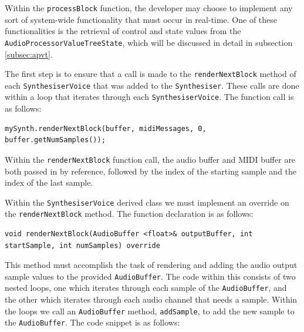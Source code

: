 \documentclass[a4paper,12pt]{report}
\begin{document}
Within the \texttt{process\-Block} function, the developer may choose to implement any sort of system-wide functionality that must occur in real-time. One of these functionalities is the retrieval of control and state values from the \texttt{Audio\-Processor\-Value\-Tree\-State}, which will be discussed in detail in subsection \ref{subsec:apvt}.

The first step is to ensure that a call is made to the \texttt{render\-Next\-Block} method of each \texttt{Synthesiser\-Voice} that was added to the \texttt{Synthesiser}. These calls are done within a loop that iterates through each \texttt{Synthesiser\-Voice}. The function call is as follows: 

 \noindent\begin{minipage}{\linewidth} \begin{lstlisting}[caption={\texttt{renderNextBlock} function call},label={code:rendernextblockfunccall},captionpos=b]
mySynth.renderNextBlock(buffer, midiMessages, 0, buffer.getNumSamples());
\end{lstlisting} \end{minipage}

Within the \texttt{renderNextBlock} function call, the audio buffer and MIDI buffer are both passed in by reference, followed by the index of the starting sample and the index of the last sample.

Within the \texttt{Synthesiser\-Voice} derived class we must implement an override on the \texttt{render\-Next\-Block} method. The function declaration is as follows:

 \noindent\begin{minipage}{\linewidth} \begin{lstlisting}[caption={\texttt{renderNextBlock()} override},label={code:rendernextblockoverride},captionpos=b]
void renderNextBlock(AudioBuffer <float>& outputBuffer, int startSample, int numSamples) override
\end{lstlisting} \end{minipage}

This method must accomplish the task of rendering and adding the audio output sample values to the provided \texttt{Audio\-Buffer}. The code within this consists of two nested loops, one which iterates through each sample of the \texttt{Audio\-Buffer}, and the other which iterates through each audio channel that needs a sample. Within the loops we call an \texttt{Audio\-Buffer} method, \texttt{add\-Sample}, to add the new sample to the \texttt{Audio\-Buffer}. The code snippet is as follows:
\end{document}
